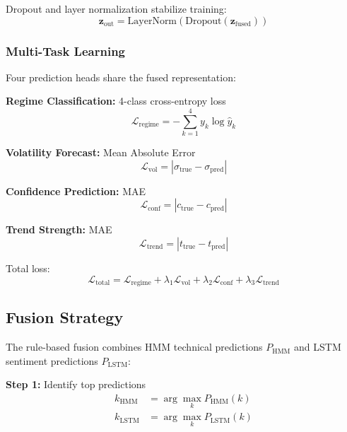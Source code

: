 \documentclass[conference]{IEEEtran}
\begin{document}
Dropout and layer normalization stabilize training:
\begin{equation}
\mathbf{z}_{\text{out}} = \text{LayerNorm}(\text{Dropout}(\mathbf{z}_{\text{fused}}))
\end{equation}

\subsubsection{Multi-Task Learning}
Four prediction heads share the fused representation:

\textbf{Regime Classification:} 4-class cross-entropy loss
\begin{equation}
\mathcal{L}_{\text{regime}} = -\sum_{k=1}^{4}y_k\log\hat{y}_k
\end{equation}

\textbf{Volatility Forecast:} Mean Absolute Error
\begin{equation}
\mathcal{L}_{\text{vol}} = |\sigma_{\text{true}} - \sigma_{\text{pred}}|
\end{equation}

\textbf{Confidence Prediction:} MAE
\begin{equation}
\mathcal{L}_{\text{conf}} = |c_{\text{true}} - c_{\text{pred}}|
\end{equation}

\textbf{Trend Strength:} MAE
\begin{equation}
\mathcal{L}_{\text{trend}} = |t_{\text{true}} - t_{\text{pred}}|
\end{equation}

Total loss:
\begin{equation}
\mathcal{L}_{\text{total}} = \mathcal{L}_{\text{regime}} + \lambda_1\mathcal{L}_{\text{vol}} + \lambda_2\mathcal{L}_{\text{conf}} + \lambda_3\mathcal{L}_{\text{trend}}
\end{equation}

\subsection{Fusion Strategy}

The rule-based fusion combines HMM technical predictions $P_{\text{HMM}}$ and LSTM sentiment predictions $P_{\text{LSTM}}$:

\textbf{Step 1:} Identify top predictions
\begin{equation}
\begin{aligned}
k_{\text{HMM}} &= \arg\max_k P_{\text{HMM}}(k) \\
k_{\text{LSTM}} &= \arg\max_k P_{\text{LSTM}}(k)
\end{aligned}
\end{equation}
\end{document}
